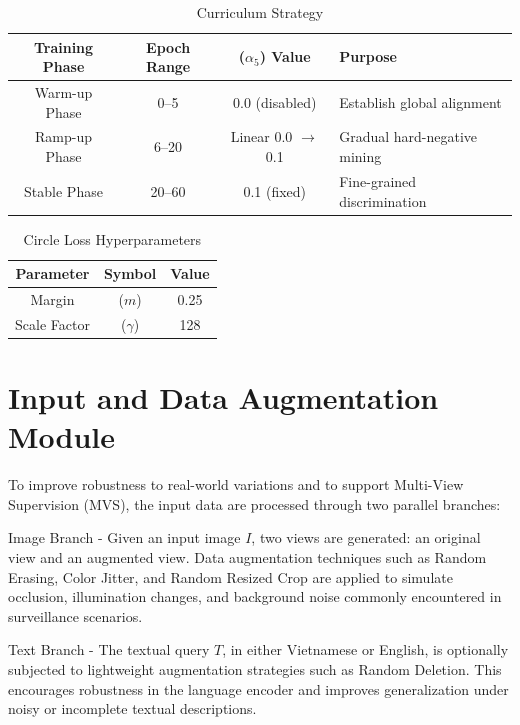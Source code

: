 \documentclass[../main.tex]{subfiles}
\begin{document}
\begin{table}[htbp]
    \centering
    \caption{Curriculum Strategy}
    \label{tab:curr_config}
    \begin{tabularx}{\textwidth}{cccX}
        \toprule
        \textbf{Training Phase} & \textbf{Epoch Range} & \textbf{($\alpha_5$) Value} & \textbf{Purpose} \\
        \midrule
        Warm-up Phase & 0--5 & 0.0 (disabled) & Establish global alignment \\
        Ramp-up Phase & 6--20 & Linear 0.0 $\to$ 0.1 & Gradual hard-negative mining \\
        Stable Phase & 20--60 & 0.1 (fixed) & Fine-grained discrimination \\
        \bottomrule
    \end{tabularx}
\end{table}

\begin{table}[htbp]
    \centering
    \caption{Circle Loss Hyperparameters}
    \label{tab:cir_config}
    \begin{tabular}{ccc}
        \toprule
        \textbf{Parameter} & \textbf{Symbol} & \textbf{Value} \\
        \midrule
        Margin & ($m$) & 0.25 \\
        Scale Factor & ($\gamma$) & 128 \\
        \bottomrule
    \end{tabular}
\end{table}

\section{Input and Data Augmentation Module}
To improve robustness to real-world variations and to support Multi-View Supervision (MVS), the input data are processed through two parallel branches:

\noindent Image Branch - Given an input image $I$, two views are generated: an original view and an augmented view. Data augmentation techniques such as Random Erasing, Color Jitter, and Random Resized Crop are applied to simulate occlusion, illumination changes, and background noise commonly encountered in surveillance scenarios.

\noindent Text Branch - The textual query $T$, in either Vietnamese or English, is optionally subjected to lightweight augmentation strategies such as Random Deletion. This encourages robustness in the language encoder and improves generalization under noisy or incomplete textual descriptions.
\end{document}
